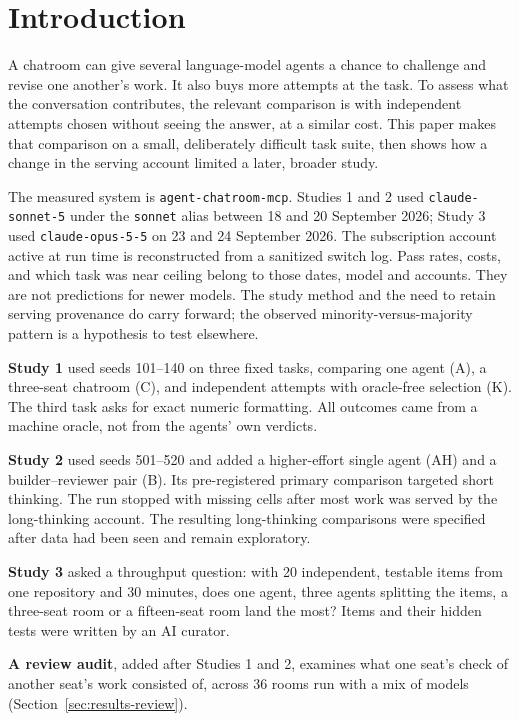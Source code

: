 \section{Introduction}
\label{sec:introduction}

A chatroom can give several language-model agents a chance to challenge and revise one another's work. It also buys more attempts at the task. To assess what the conversation contributes, the relevant comparison is with independent attempts chosen without seeing the answer, at a similar cost. This paper makes that comparison on a small, deliberately difficult task suite, then shows how a change in the serving account limited a later, broader study.

The measured system is \texttt{agent-chatroom-mcp}. Studies 1 and 2 used \texttt{claude-sonnet-5} under the \texttt{sonnet} alias between 18 and 20 September 2026; Study 3 used \texttt{claude-opus-5-5} on 23 and 24 September 2026. The subscription account active at run time is reconstructed from a sanitized switch log. Pass rates, costs, and which task was near ceiling belong to those dates, model and accounts. They are not predictions for newer models. The study method and the need to retain serving provenance do carry forward; the observed minority-versus-majority pattern is a hypothesis to test elsewhere.

\textbf{Study 1} used seeds 101--140 on three fixed tasks, comparing one agent (A), a three-seat chatroom (C), and independent attempts with oracle-free selection (K). The third task asks for exact numeric formatting. All outcomes came from a machine oracle, not from the agents' own verdicts.

\textbf{Study 2} used seeds 501--520 and added a higher-effort single agent (AH) and a builder--reviewer pair (B). Its pre-registered primary comparison targeted short thinking. The run stopped with missing cells after most work was served by the long-thinking account. The resulting long-thinking comparisons were specified after data had been seen and remain exploratory.

\textbf{Study 3} asked a throughput question: with 20 independent, testable items from one repository and 30 minutes, does one agent, three agents splitting the items, a three-seat room or a fifteen-seat room land the most? Items and their hidden tests were written by an AI curator.

\textbf{A review audit}, added after Studies 1 and 2, examines what one seat's check of another seat's work consisted of, across 36 rooms run with a mix of models (Section~\ref{sec:results-review}).

